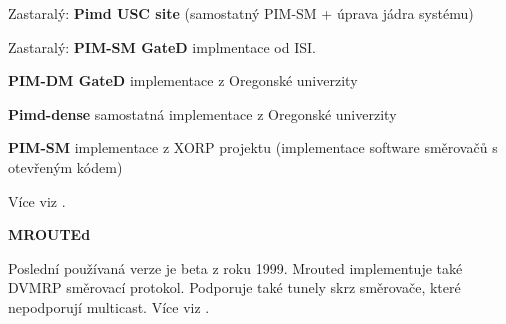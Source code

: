 Zastaralý: \textbf{Pimd USC site} (samostatný PIM-SM + úprava jádra systému)

Zastaralý: \textbf{PIM-SM GateD} implmentace od ISI.

\textbf{PIM-DM GateD} implementace z Oregonské univerzity

\textbf{Pimd-dense} samostatná implementace z Oregonské univerzity

\textbf{PIM-SM} implementace z XORP projektu (implementace software směrovačů s otevřeným kódem)

\vspace{10pt}

Více viz \cite{pimdURL}.

\vspace{10pt}

\textbf{MROUTEd}

\vspace{5pt}

Poslední používaná verze je beta z roku 1999. Mrouted implementuje také DVMRP směrovací protokol. Podporuje také tunely skrz směrovače, které nepodporují multicast. Více viz \cite{mroutedURL}.
